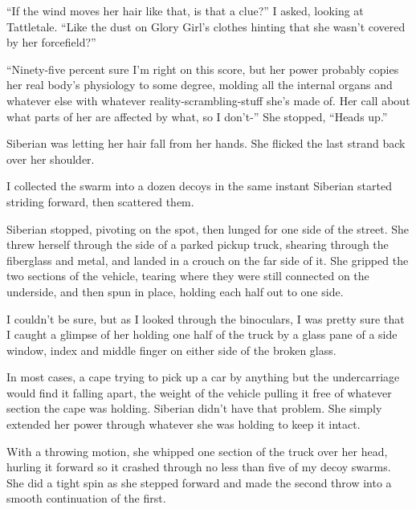 ``If the wind moves her hair like that, is that a clue?'' I asked, looking at Tattletale.  ``Like the dust on Glory Girl's clothes hinting that she wasn't covered by her forcefield?''



``Ninety-five percent sure I'm right on this score, but her power probably copies her real body's physiology to some degree, molding all the internal organs and whatever else with whatever reality-scrambling-stuff she's made of.  Her call about what parts of her are affected by what, so I don't-''  She stopped, ``Heads up.''



Siberian was letting her hair fall from her hands.  She flicked the last strand back over her shoulder.



I collected the swarm into a dozen decoys in the same instant Siberian started striding forward, then scattered them.



Siberian stopped, pivoting on the spot, then lunged for one side of the street.  She threw herself through the side of a parked pickup truck, shearing through the fiberglass and metal, and landed in a crouch on the far side of it.  She gripped the two sections of the vehicle, tearing where they were still connected on the underside, and then spun in place, holding each half out to one side.



I couldn't be sure, but as I looked through the binoculars, I was pretty sure that I caught a glimpse of her holding one half of the truck by a glass pane of a side window, index and middle finger on either side of the broken glass.



In most cases, a cape trying to pick up a car by anything but the undercarriage would find it falling apart, the weight of the vehicle pulling it free of whatever section the cape was holding.  Siberian didn't have that problem.  She simply extended her power through whatever she was holding to keep it intact.



With a throwing motion, she whipped one section of the truck over her head, hurling it forward so it crashed through no less than five of my decoy swarms.  She did a tight spin as she stepped forward and made the second throw into a smooth continuation of the first.



